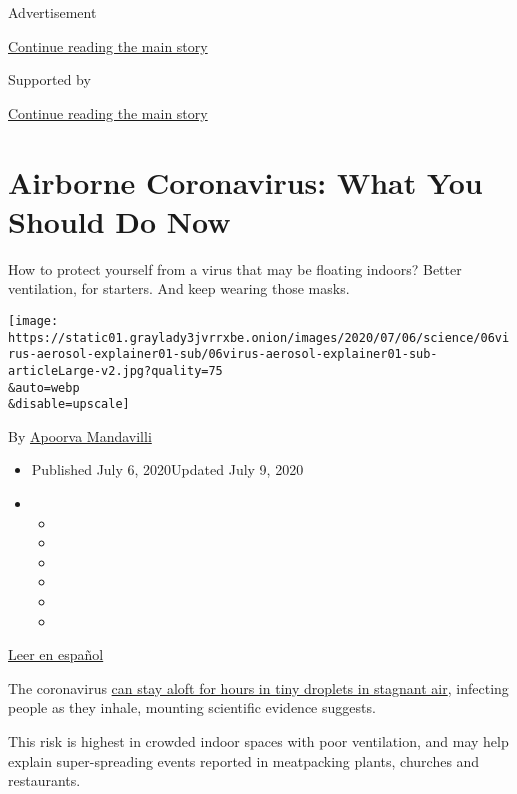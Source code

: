 Advertisement

\protect\hyperlink{after-top}{Continue reading the main story}

Supported by

\protect\hyperlink{after-sponsor}{Continue reading the main story}

\hypertarget{airborne-coronavirus-what-you-should-do-now}{%
\section{Airborne Coronavirus: What You Should Do
Now}\label{airborne-coronavirus-what-you-should-do-now}}

How to protect yourself from a virus that may be floating indoors?
Better ventilation, for starters. And keep wearing those masks.

\texttt{[image: https://static01.graylady3jvrrxbe.onion/images/2020/07/06/science/06virus-aerosol-explainer01-sub/06virus-aerosol-explainer01-sub-articleLarge-v2.jpg?quality=75\\\&auto=webp\\\&disable=upscale]}

By
\href{https://www.nytimes3xbfgragh.onion/by/apoorva-mandavilli}{Apoorva
Mandavilli}

\begin{itemize}
\item
  Published July 6, 2020Updated July 9, 2020
\item
  \begin{itemize}
  \item
  \item
  \item
  \item
  \item
  \item
  \end{itemize}
\end{itemize}

\href{https://www.nytimes3xbfgragh.onion/es/2020/07/08/espanol/ciencia-y-tecnologia/coronavirus-aire-aerosoles.html}{Leer
en español}

The coronavirus
\href{https://www.nytimes3xbfgragh.onion/2020/07/04/health/239-experts-with-one-big-claim-the-coronavirus-is-airborne.html}{can
stay aloft for hours in tiny droplets in stagnant air}, infecting people
as they inhale, mounting scientific evidence suggests.

This risk is highest in crowded indoor spaces with poor ventilation, and
may help explain super-spreading events reported in meatpacking plants,
churches and restaurants.

